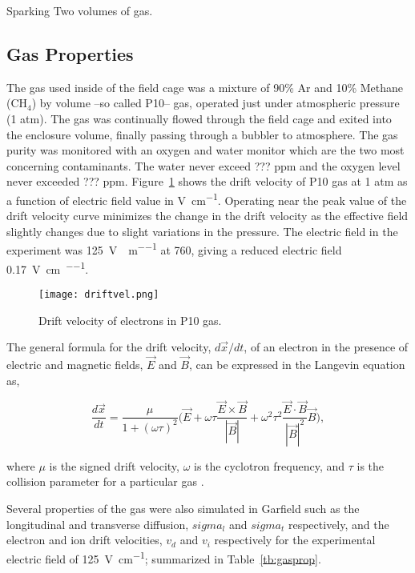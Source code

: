 Sparking
Two volumes of gas. 


\subsection{Gas Properties}
The gas used inside of the field cage was a mixture of 90\% Ar and 10\% Methane ($\mathrm{CH_4}$) by volume --so called P10--  gas, operated just under atmospheric pressure (1 atm). The  gas was continually flowed through the field cage and exited into the enclosure volume, finally passing through a bubbler to atmosphere. The gas purity was monitored with an oxygen and water monitor which are the two most concerning contaminants. The water never exceed  ??? ppm  and the oxygen level never exceeded ??? ppm. Figure~\ref{fig:driftvel} shows the drift velocity of P10 gas at 1 atm as a function of electric field value in \si{\volt\per\centi\metre}. Operating near the peak value of the drift velocity curve minimizes the change in the drift velocity as the effective field slightly changes due to slight variations in the pressure. The electric field in the experiment was \SI{125}{\volt\per\centi\per\metre} at \SI{760}{\torr}, giving a reduced electric field \SI{0.17}{\volt\per\centi\metre\per\torr}.

\begin{figure}[H]
\texttt{[image: driftvel.png]}
\caption{Drift velocity of electrons in P10 gas.}
\label{fig:driftvel}
\end{figure}

The general formula for the drift velocity, $d\vec{x}/dt$, of an electron in the presence of electric and magnetic fields, $\vec{E}$ and $\vec{B}$, can be expressed in the Langevin equation as,  

\begin{equation}
\frac{d\vec{x}}{dt} = \frac{\mu}{1+(\omega\tau)^2}\Big(\vec{E} + \omega\tau\frac{\vec{E}\times\vec{B}}{|\vec{B}|}+\omega^2\tau^2\frac{\vec{E}\cdot\vec{B}}{|\vec{B}|^2}\vec{B}\Big),
\label{eq:elecdrift}
\end{equation}

where $\mu$ is the signed drift velocity, $\omega$ is the cyclotron frequency, and $\tau$ is the collision parameter for a particular gas \cite{blumrol}.

Several properties of the gas were also simulated in Garfield such as the longitudinal and transverse diffusion, $sigma_l$ and $sigma_t$ respectively, and the electron and ion drift velocities, $v_d$ and $v_i$ respectively for the experimental electric field of \SI{125}{\volt\per\centi\metre}; summarized in Table~\ref{tb:gasprop}.



